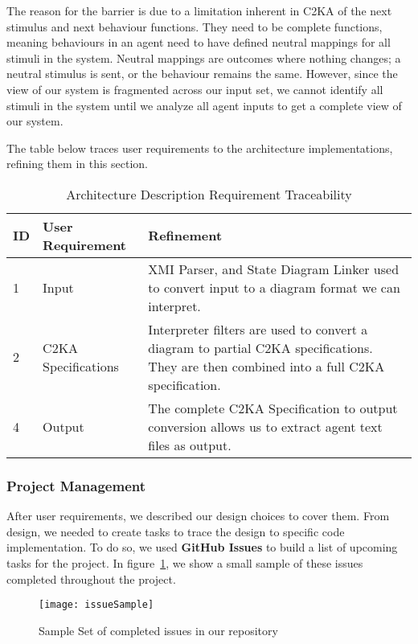 The reason for the barrier is due to a limitation inherent in C2KA of the next stimulus and next behaviour functions.
They need to be complete functions,
meaning behaviours in an agent need to have defined neutral mappings for all stimuli in the system.
Neutral mappings are outcomes where nothing changes; a neutral stimulus is sent, or the behaviour remains the same.
However, since the view of our system is fragmented across our input set,
we cannot identify all stimuli in the system until we analyze all agent inputs to get a complete view of our system.


The table below traces user requirements to the architecture implementations, refining them in this section.
\begin{table}[htbp]
    \centering
    \caption{Architecture Description Requirement Traceability}\label{tab:arch-description-table}
    \begin{tabularx}{\textwidth}{| l | l | X |}
        \hline
        \textbf{ID} & \textbf{User Requirement} & \textbf{Refinement} \\
        \hline
        1 & Input & XMI Parser, and State Diagram Linker used to convert input to a diagram format we can interpret. \\ \hline
        2 & C2KA Specifications & Interpreter filters are used to convert a diagram to partial C2KA specifications.
        They are then combined into a full C2KA specification. \\ \hline
        4 & Output & The complete C2KA Specification to output conversion allows us to extract agent text files as output.  \\ \hline
    \end{tabularx}
\end{table}

\newpage
\subsubsection{Project Management}\label{subsubsec:proj-mngmnt}
After user requirements, we described our design choices to cover them.
From design, we needed to create tasks to trace the design to specific code implementation.
To do so, we used \textbf{GitHub Issues} to build a list of upcoming tasks for the project.
In figure~\ref{fig:sampleIssueList}, we show a small sample of these issues completed throughout the project.
\begin{figure}[ht]
    \centering
    \texttt{[image: issueSample]}
    \caption{Sample Set of completed issues in our repository}
    \label{fig:sampleIssueList}
\end{figure}

